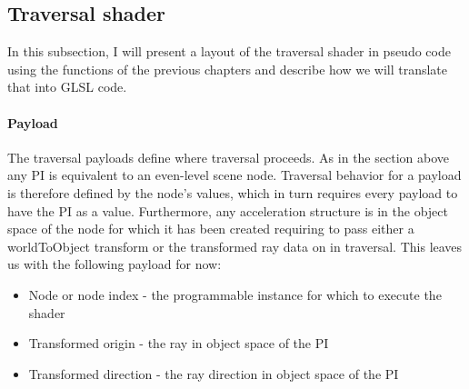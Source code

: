 \newpage
\subsection{Traversal shader}
\label{sec:TraversalShader}
In this subsection, I will present a layout of the traversal shader in pseudo code using the functions of the previous chapters and describe how we will translate that into GLSL code.\\
\paragraph{Payload}
The traversal payloads define where traversal proceeds. As in the section above any PI is equivalent to an even-level scene node. Traversal behavior for a payload is therefore defined by the node's values, which in turn requires every payload to have the PI as a value. Furthermore, any acceleration structure is in the object space of the node for which it has been created requiring to pass either a worldToObject transform or the transformed ray data on in traversal. This leaves us with the following payload for now:
\begin{itemize}
    \item Node or node index - the programmable instance for which to execute the shader
    \item Transformed origin - the ray in object space of the PI
    \item Transformed direction - the ray direction in object space of the PI
\end{itemize}

